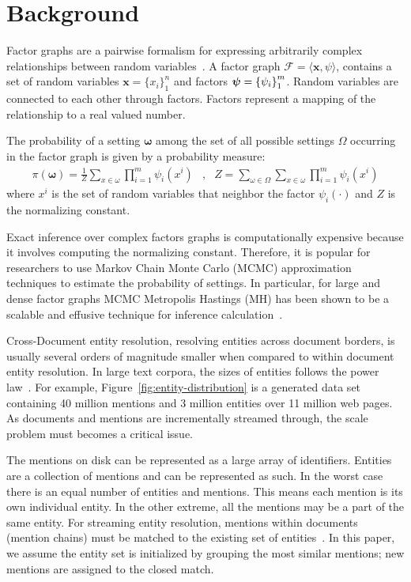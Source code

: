 
\section{Background}
\label{sec:optimizer:background}

Factor graphs
are a pairwise formalism for expressing arbitrarily complex
relationships between random variables~\cite{koller2009probabilistic}.
A factor graph $\mathcal{F} = \langle \textbf{x}, \psi \rangle$, contains a set of random
variables $ \textbf{x} = {\{x_i \}}^n_1$ and
factors ${\textbf{\boldmath$\psi$\unboldmath}} = { \{\psi_i\} }^m_1 $.
Random variables are connected to each other through factors.
Factors represent a mapping of the relationship to a real valued number.

The probability of a setting $\mathbf{\omega}$ among the set of all possible
settings $\Omega$ occurring in the factor graph is given by a probability measure:
\begin{align*}
\pi(\mathbf{\omega}) = \frac{1}{Z} \sum_{x \in \omega} \prod_{i=1}^{m} \psi_i(x^i) &,&  Z = \sum_{\omega \in \Omega} \sum_{x \in \omega}  \prod_{i=1}^{m} \psi_i(x^i) 
\end{align*}
where $x^i$ is the set of random variables that neighbor the factor
$\psi_{i}(\cdot)$ and $Z$ is the normalizing constant.


Exact inference over complex factors graphs is computationally expensive
because it involves computing the normalizing constant.
Therefore, it is popular for researchers to use Markov Chain Monte Carlo (MCMC) 
approximation techniques to estimate the probability of settings.
In particular, for large and dense factor graphs MCMC Metropolis Hastings (MH) has
been shown to be a scalable and effusive technique for 
inference calculation~\cite{singh2011large}.

Cross-Document entity resolution, resolving entities across document borders,
is usually several orders of magnitude smaller when compared to within document entity resolution.
In large text corpora, the sizes of entities follows the power law~\cite{singh12:wiki-links}.
For example, Figure~\ref{fig:entity-distribution} is a generated data set containing
40 million mentions and 3 million entities over 11 million web pages.
As documents and mentions are incrementally streamed through,
the scale problem must becomes a critical issue.

The mentions on disk can be represented as a large array of identifiers.
Entities are a collection of mentions and can be represented as such.
In the worst case there is an equal number of entities and mentions.
This means each mention is its own individual entity.
In the other extreme, all the mentions may be a part of the same entity.
For streaming entity resolution, mentions within documents (mention chains)
must be matched to the existing set of entities~\cite{rao2010streaming}.
In this paper, we assume the entity set is initialized by grouping the most
similar mentions; new mentions are assigned to the closed match.

